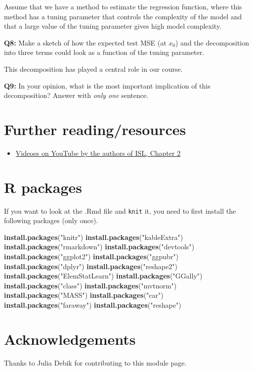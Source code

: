 \documentclass[]{article}
\newenvironment{Shaded}{\begin{snugshade}}{\end{snugshade}}
\newcommand{\KeywordTok}[1]{\textcolor[rgb]{0.13,0.29,0.53}{\textbf{#1}}}
\newcommand{\StringTok}[1]{\textcolor[rgb]{0.31,0.60,0.02}{#1}}
\newcommand{\NormalTok}[1]{#1}
\providecommand{\tightlist}{%
  \setlength{\itemsep}{0pt}\setlength{\parskip}{0pt}}
\begin{document}
Assume that we have a method to estimate the regression function, where
this method has a tuning parameter that controls the complexity of the
model and that a large value of the tuning parameter gives high model
complexity.

\textbf{Q8:} Make a sketch of how the expected test MSE (at \(x_0\)) and
the decomposition into three terms could look as a function of the
tuning parameter.

This decomposition has played a central role in our course.

\textbf{Q9:} In your opinion, what is the most important implication of
this decomposition? Answer with \emph{only one} sentence.

\section{ Further reading/resources}\label{further-readingresources}

\begin{itemize}
\tightlist
\item
  \href{https://www.youtube.com/playlist?list=PL5-da3qGB5IDvuFPNoSqheihPOQNJpzyy}{Videoes
  on YouTube by the authors of ISL, Chapter 2}
\end{itemize}

\section{ R packages}\label{r-packages}

If you want to look at the .Rmd file and \texttt{knit} it, you need to
first install the following packages (only once).

\begin{Shaded}
\begin{Highlighting}[]
\KeywordTok{install.packages}\NormalTok{(}\StringTok{"knitr"}\NormalTok{)}
\KeywordTok{install.packages}\NormalTok{(}\StringTok{"kableExtra"}\NormalTok{)}
\KeywordTok{install.packages}\NormalTok{(}\StringTok{"rmarkdown"}\NormalTok{)}
\KeywordTok{install.packages}\NormalTok{(}\StringTok{"devtools"}\NormalTok{)}
\KeywordTok{install.packages}\NormalTok{(}\StringTok{"ggplot2"}\NormalTok{)}
\KeywordTok{install.packages}\NormalTok{(}\StringTok{"ggpubr"}\NormalTok{)}
\KeywordTok{install.packages}\NormalTok{(}\StringTok{"dplyr"}\NormalTok{)}
\KeywordTok{install.packages}\NormalTok{(}\StringTok{"reshape2"}\NormalTok{)}
\KeywordTok{install.packages}\NormalTok{(}\StringTok{"ElemStatLearn"}\NormalTok{)}
\KeywordTok{install.packages}\NormalTok{(}\StringTok{"GGally"}\NormalTok{)}
\KeywordTok{install.packages}\NormalTok{(}\StringTok{"class"}\NormalTok{)}
\KeywordTok{install.packages}\NormalTok{(}\StringTok{"mvtnorm"}\NormalTok{)}
\KeywordTok{install.packages}\NormalTok{(}\StringTok{"MASS"}\NormalTok{)}
\KeywordTok{install.packages}\NormalTok{(}\StringTok{"car"}\NormalTok{)}
\KeywordTok{install.packages}\NormalTok{(}\StringTok{"faraway"}\NormalTok{)}
\KeywordTok{install.packages}\NormalTok{(}\StringTok{"reshape"}\NormalTok{)}
\end{Highlighting}
\end{Shaded}

\section{Acknowledgements}\label{acknowledgements}

Thanks to Julia Debik for contributing to this module page.
\end{document}
